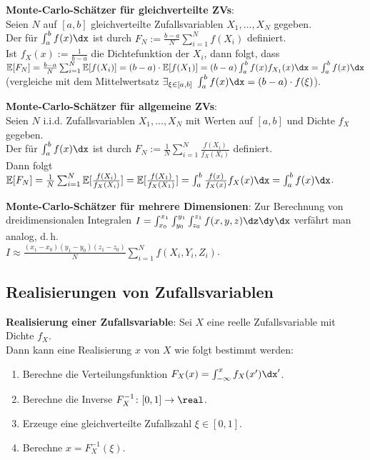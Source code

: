 \linie

\textbf{Monte-Carlo-Schätzer für gleichverteilte ZVs}:\\
Seien $N$ auf $[a, b]$ gleichverteilte Zufallsvariablen $X_1, \dotsc, X_N$ gegeben.\\
Der  für $\int_a^b f(x) \dx$ ist durch
$F_N := \frac{b - a}{N} \sum_{i=1}^N f(X_i)$ definiert.\\
Ist $f_X(x) := \frac{1}{b-a}$ die Dichtefunktion der $X_i$, dann folgt, dass\\
$\EE[F_N] = \frac{b - a}{N} \sum_{i=1}^N \EE[f(X_i)]
= (b-a) \cdot \EE[f(X_1)] = (b-a) \int_a^b f(x)f_{X_1}(x) \dx = \int_a^b f(x) \dx$\\
(vergleiche mit dem Mittelwertsatz
$\exists_{\xi \in [a, b]}\; \int_a^b f(x) \dx = (b-a) \cdot f(\xi)$).

\textbf{Monte-Carlo-Schätzer für allgemeine ZVs}:\\
Seien $N$ i.i.d. Zufallsvariablen $X_1, \dotsc, X_N$ mit Werten auf $[a, b]$ und
Dichte $f_X$ gegeben.\\
Der  für $\int_a^b f(x) \dx$ ist durch
$F_N := \frac{1}{N} \sum_{i=1}^N \frac{f(X_i)}{f_X(X_i)}$ definiert.\\
Dann folgt
$\EE[F_N] = \frac{1}{N} \sum_{i=1}^N \EE[\frac{f(X_i)}{f_X(X_i)}]
= \EE[\frac{f(X_1)}{f_X(X_1)}] = \int_a^b \frac{f(x)}{f_X(x)} f_X(x) \dx = \int_a^b f(x) \dx$.

\linie

\textbf{Monte-Carlo-Schätzer für mehrere Dimensionen}:
Zur Berechnung von dreidimensionalen Integralen
$I = \int_{x_0}^{x_1} \int_{y_0}^{y_1} \int_{z_0}^{z_1} f(x, y, z) \dz\dy\dx$
verfährt man analog, d.\,h.\\
$I \approx \frac{(x_1 - x_0) (y_1 - y_0) (z_1 - z_0)}{N} \sum_{i=1}^N f(X_i, Y_i, Z_i)$.

\pagebreak

\subsection{%
    Realisierungen von Zufallsvariablen%
}

\textbf{Realisierung einer Zufallsvariable}:
Sei $X$ eine reelle Zufallsvariable mit Dichte $f_X$.\\
Dann kann eine Realisierung $x$ von $X$ wie folgt bestimmt werden:
\begin{enumerate}
    \item
    Berechne die Verteilungsfunktion $F_X(x) = \int_{-\infty}^x f_X(x') \dx'$.
    
    \item
    Berechne die Inverse $F_X^{-1}\colon [0, 1] \to \real$.
    
    \item
    Erzeuge eine gleichverteilte Zufallszahl $\xi \in [0, 1]$.
    
    \item
    Berechne $x = F_X^{-1}(\xi)$.
\end{enumerate}

